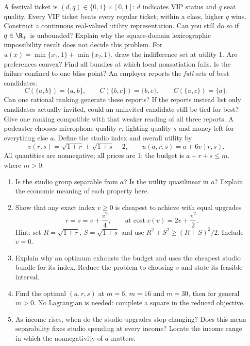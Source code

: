 A festival ticket is $(d,q)\in\{0,1\}\times[0,1]$: $d$ indicates VIP status and $q$ seat quality. Every VIP ticket beats every regular ticket; within a class, higher $q$ wins. Construct a continuous real-valued utility representation. Can you still do so if $q\in\R_+$ is unbounded? Explain why the square-domain lexicographic impossibility result does not decide this problem.
For $u(x)=\min\{x_1,1\}+\min\{x_2,1\}$, draw the indifference set at utility 1. Are preferences convex? Find all bundles at which local nonsatiation fails. Is the failure confined to one bliss point?
An employer reports the \emph{full} sets of best candidates:
\[
 C(\{a,b\})=\{a,b\},\qquad C(\{b,c\})=\{b,c\},\qquad C(\{a,c\})=\{a\}.
\]
Can one rational ranking generate these reports? If the reports instead list only candidates actually invited, could an uninvited candidate still be tied for best? Give one ranking compatible with that weaker reading of all three reports.
\clearpage
{}
A podcaster chooses microphone quality $r$, lighting quality $s$ and money left for everything else $a$. Define the studio index and overall utility by
\[
 v(r,s)=\sqrt{1+r}+\sqrt{1+s}-2,\qquad
 u(a,r,s)=a+6v(r,s).
\]
All quantities are nonnegative; all prices are 1; the budget is $a+r+s\le m$, where $m>0$.
\begin{enumerate}[label=(\alph*)]
\item Is the studio group separable from $a$? Is the utility quasilinear in $a$? Explain the economic meaning of each property here.
\item Show that any exact index $v\ge0$ is cheapest to achieve with equal upgrades
\[
 r=s=v+\frac{v^2}{4},\qquad\text{at cost }c(v)=2v+\frac{v^2}{2}.
\]
Hint: set $R=\sqrt{1+r}$, $S=\sqrt{1+s}$ and use $R^2+S^2\ge(R+S)^2/2$. Include $v=0$.
\item Explain why an optimum exhausts the budget and uses the cheapest studio bundle for its index. Reduce the problem to choosing $v$ and state its feasible interval.
\item Find the optimal $(a,r,s)$ at $m=6$, $m=16$ and $m=30$, then for general $m>0$. No Lagrangian is needed: complete a square in the reduced objective.
\item As income rises, when do the studio upgrades stop changing? Does this mean separability fixes studio spending at every income? Locate the income range in which the nonnegativity of $a$ matters.
\end{enumerate}
